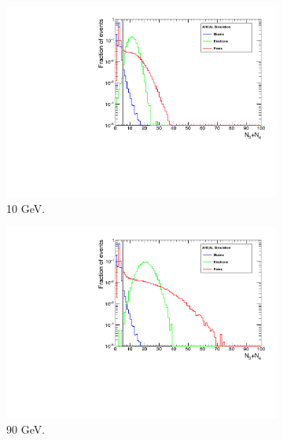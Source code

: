 \begin{figure}[htbp!]
	\begin{subfigure}[t]{0.5\textwidth}
		\centering
		\includegraphics[width=1\linewidth]{chap5/fig_AHCAL_timing/Pions/SelectionCut_N3N4_10GeV}
		\caption{10 GeV.} \label{fig:pi10GeV_N3N4}
	\end{subfigure}
	\hfill
	\begin{subfigure}[t]{0.5\textwidth}
		\centering
		\includegraphics[width=1\linewidth]{chap5/fig_AHCAL_timing/Pions/SelectionCut_N3N4_90GeV}
		\caption{90 GeV.} \label{fig:pi90GeV_N3N4}
	\end{subfigure}
	\hfill
	\begin{subfigure}[t]{0.5\textwidth}
		\centering

\end{subfigure}
\end{figure}
